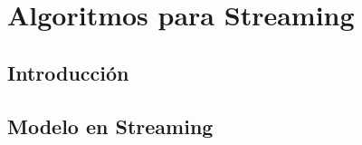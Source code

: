 \documentclass{subfiles}
\begin{document}
  \chapter{Algoritmos para Streaming}

    \section{Introducción}
      \paragraph{}

    \section{Modelo en Streaming}
      \paragraph{}
\end{document}
